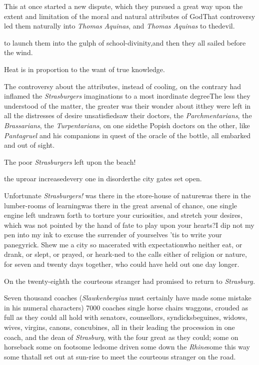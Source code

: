 \documentclass{article}
\begin{document}
This at once started a new dispute, which they pursued a great
way upon the extent and limitation of the moral and natural
attributes of God\tsk That controversy led them naturally into
\textit{Thomas} \textit{Aquinas}, and \textit{Thomas
Aquinas} to the\break devil.

to launch them into the gulph of school-divinity,\tsk and then they all
sailed before the wind.

Heat is in proportion to the want of true knowledge.

The controversy about the attributes, \etc instead of
cooling, on the contrary had inflamed the \textit{Strasburgers}
imaginations to a most inordinate degree\tsk The less they
understood of the matter, the greater was their wonder about
it\tsk they were left in all the distresses of desire
unsatisfied\tsk saw their doctors, the
\textit{Parchmentarians}, the \textit{Brassarians}, the
\textit{Turpentarians}, on one side\tsk the Popish
doctors
on the other, like \textit{Pantagruel} and his companions in
quest of the oracle of the bottle, all embarked and out of
sight.

\tsh The poor \textit{Strasburgers} left upon the
beach!

\noindent
{}\break
\tsk the uproar
increased\tsk every one in disorder\tsk the city gates set
open.\tsk

Unfortunate \textit{Strasburgers!} was there in the
store-house of nature\tsk was there in the lumber-rooms of
learning\tsk was there in the great arsenal of chance, one
single engine left undrawn forth to torture your
curiosities, and stretch your desires, which was not pointed
by the hand of fate to play upon your hearts?\tsk I dip not
my pen into my ink to excuse the surrender of yourselves\tsk
’tis to write your panegyrick. Shew me a city so macerated
with expectation\tsh who neither eat, or drank, or slept, or
prayed, or heark-\sic\break ned to the calls either of religion or
nature, for seven and twenty days together, who could have
held out one day longer.

On the twenty-eighth the courteous stranger had promised to
return to \textit{Strasburg.}

Seven thousand coaches (\textit{Slawkenber\-gius} must certainly have made some
mistake in his numeral characters) 7000\break
coaches single horse chairs\tsh{} waggons, crouded as full as they could all hold with senators, counsellors, 
syndicks\tsk beguines, widows, wives, virgins, canons,
concubines, all in their\break
{}
leading the procession in one coach, and the dean of \textit{Strasburg}, with the
four great \break
{}
as they could; some on horseback\tsh 
some on foot\tsk some led\tsk some driven\tsk
some down the \textit{Rhine}\tsk some this way\tsk
some that\tsk all set out at sun-rise to meet 
the courteous stranger on the road.
\end{document}
